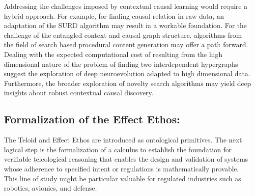 Addressing the challenges imposed by contextual causal learning would require a hybrid approach. For example, for finding causal relation in raw data, an adaptation of the SURD algorithm\cite{martinez2024decomposing} may result in a workable foundation. For the challenge of the entangled context and causal graph structure, algorithms from the field of search based procedural content generation\cite{togelius2011search} may offer a path forward. Dealing with the expected computational cost of resulting from the high dimensional nature of the problem of finding two interdependent hypergraphs suggest the exploration of deep neuro\-evolution adapted to high dimensional data\cite{colas2020scaling}. Furthermore, the broader exploration of novelty search\cite{lehman2011abandoning} algorithms may yield deep insights about robust contextual causal discovery. 

\subsection{Formalization of the Effect Ethos:} 

The Teloid and Effect Ethos are introduced as ontological primitives. The next logical step is the formalization of a calculus to establish the foundation for verifiable teleological reasoning that enables the design and validation of systems whose adherence to specified intent or regulations is mathematically provable. This line of study might be particular valuable for regulated industries such as robotics, avionics, and defense. 

% 

\newpage